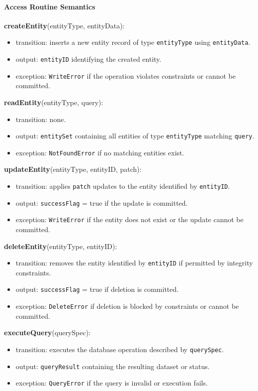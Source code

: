 \documentclass[12pt, titlepage]{article}
\begin{document}
\paragraph{Access Routine Semantics}

\noindent \textbf{createEntity}(entityType, entityData):
\begin{itemize}
  \item transition: inserts a new entity record of type \texttt{entityType} using \texttt{entityData}.
  \item output: \texttt{entityID} identifying the created entity.
  \item exception: \texttt{WriteError} if the operation violates constraints or cannot be committed.
\end{itemize}

\noindent \textbf{readEntity}(entityType, query):
\begin{itemize}
  \item transition: none.
  \item output: \texttt{entitySet} containing all entities of type \texttt{entityType} matching \texttt{query}.
  \item exception: \texttt{NotFoundError} if no matching entities exist.
\end{itemize}

\noindent \textbf{updateEntity}(entityType, entityID, patch):
\begin{itemize}
  \item transition: applies \texttt{patch} updates to the entity identified by \texttt{entityID}.
  \item output: \texttt{successFlag} = true if the update is committed.
  \item exception: \texttt{WriteError} if the entity does not exist or the update cannot be committed.
\end{itemize}

\noindent \textbf{deleteEntity}(entityType, entityID):
\begin{itemize}
  \item transition: removes the entity identified by \texttt{entityID} if permitted by integrity constraints.
  \item output: \texttt{successFlag} = true if deletion is committed.
  \item exception: \texttt{DeleteError} if deletion is blocked by constraints or cannot be committed.
\end{itemize}

\noindent \textbf{executeQuery}(querySpec):
\begin{itemize}
  \item transition: executes the database operation described by \texttt{querySpec}.
  \item output: \texttt{queryResult} containing the resulting dataset or status.
  \item exception: \texttt{QueryError} if the query is invalid or execution fails.
\end{itemize}
\end{document}
